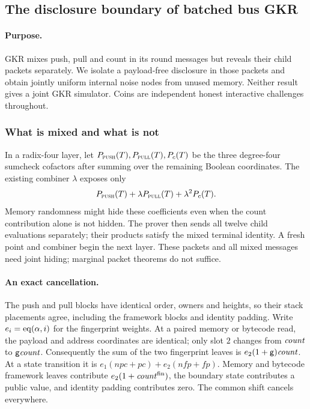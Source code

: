 \subsection{The disclosure boundary of batched bus GKR}\label{note:zk-bus-gkr-boundary}

\paragraph{Purpose.} GKR mixes push, pull and count in its round messages but reveals their child packets separately. We isolate a payload-free disclosure in those packets and obtain jointly uniform internal noise nodes from unused memory. Neither result gives a joint GKR simulator. Coins are independent honest interactive challenges throughout.

\subsubsection{What is mixed and what is not}

In a radix-four layer, let $P_{\textsc{push}}(T),P_{\textsc{pull}}(T),P_c(T)$ be the three degree-four sumcheck cofactors after summing over the remaining Boolean coordinates. The existing combiner $\lambda$ exposes only
\[
 P_{\textsc{push}}(T)+\lambda P_{\textsc{pull}}(T)+\lambda^2P_c(T).
\]
Memory randomness might hide these coefficients even when the count contribution alone is not hidden. The prover then sends all twelve child evaluations separately; their products satisfy the mixed terminal identity. A fresh point and combiner begin the next layer. These packets and all mixed messages need joint hiding; marginal packet theorems do not suffice.

\paragraph{An exact cancellation.} The push and pull blocks have identical order, owners and heights, so their stack placements agree, including the framework blocks and identity padding. Write $e_i=\operatorname{eq}(\alpha,i)$ for the fingerprint weights. At a paired memory or bytecode read, the payload and address coordinates are identical; only slot $2$ changes from $\mathit{count}$ to $\mathsf{g}\mathit{count}$. Consequently the sum of the two fingerprint leaves is $e_2(1+\mathsf{g})\mathit{count}$. At a state transition it is $e_1(\mathit{npc}+\mathit{pc})+e_2(\mathit{nfp}+\mathit{fp})$. Memory and bytecode framework leaves contribute $e_2(1+\mathit{count}^{\mathrm{fin}})$, the boundary state contributes a public value, and identity padding contributes zero. The common shift cancels everywhere.

